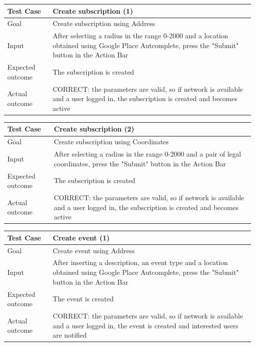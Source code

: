 \documentclass[a4paper]{scrreprt}
\begin{document}
\bigskip
\noindent
\begin{tabularx}{\linewidth}{|l|X|}
	\hline
	\textbf{Test Case} 	& \textbf{Create subscription (1)} \\ \hline
	Goal 				& Create subscription using Address\\ \hline
	Input 				& After selecting a radius in the range 0-2000 and a location obtained using Google Place Autcomplete, press the "Submit" button in the Action Bar \\ \hline
	Expected outcome 	& The subscription is created \\ \hline
	Actual outcome 		& CORRECT: the parameters are valid, so if network is available and a user logged in, the subscription is created and becomes active \\ \hline
\end{tabularx}
\bigskip
\noindent
\begin{tabularx}{\linewidth}{|l|X|}
	\hline
	\textbf{Test Case} 	& \textbf{Create subscription (2)} \\ \hline
	Goal 				& Create subscription using Coordinates\\ \hline
	Input 				& After selecting a radius in the range 0-2000 and a pair of legal coordinates, press the "Submit" button in the Action Bar \\ \hline
	Expected outcome 	& The subscription is created \\ \hline
	Actual outcome 		& CORRECT: the parameters are valid, so if network is available and a user logged in, the subscription is created and becomes active \\ \hline
\end{tabularx}
\bigskip
\noindent
\begin{tabularx}{\linewidth}{|l|X|}
	\hline
	\textbf{Test Case} 	& \textbf{Create event (1)} \\ \hline
	Goal 				& Create event using Address \\ \hline
	Input 				& After inserting a description, an event type and a location obtained using Google Place Autcomplete, press the "Submit" button in the Action Bar \\ \hline
	Expected outcome 	& The event is created \\ \hline
	Actual outcome 		& CORRECT: the parameters are valid, so if network is available and a user logged in, the event is created and interested users are notified \\ \hline
\end{tabularx}
\bigskip
\noindent
\end{document}
